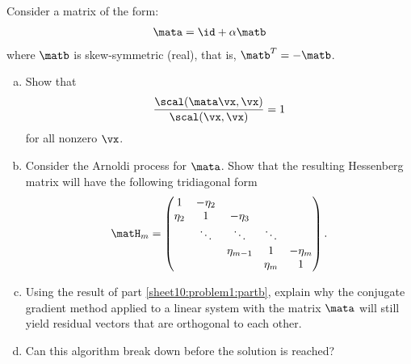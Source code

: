 
\begin{Sheet}
  \label{sheet10}

  \begin{Problem}%
    Consider a matrix of the form:
    \begin{gather*}
      \mata = \id + \alpha \matb
    \end{gather*}
    where $\matb$ is skew-symmetric (real), that is,
    $\matb^T = -\matb$.
    \begin{enumerate}[(a)]
    \item Show that
      \begin{gather*}
        \frac{\scal(\mata\vx,\vx)}{\scal(\vx,\vx)} = 1
      \end{gather*}
      for all nonzero $\vx$.
    \item\label{sheet10:problem1:partb} Consider the Arnoldi process
      for $\mata$. Show that the resulting Hessenberg matrix will have
      the following tridiagonal form
      \begin{gather*}
        \matH_m =
        \begin{pmatrix}
          1&-\eta_2&&& \\
          \eta_2&1&-\eta_3&& \\
           &\ddots&\ddots&\ddots& \\
           &&\eta_{m-1}&1&-\eta_m \\
           &&&\eta_m&1
        \end{pmatrix}
        .
      \end{gather*}
    \item Using the result of part \eqref{sheet10:problem1:partb},
      explain why the conjugate gradient method applied to a linear
      system with the matrix $\mata$ will still yield residual vectors
      that are orthogonal to each other.
    \item Can this algorithm break down before the solution is
      reached?
    \end{enumerate}
  \end{Problem}


\end{Sheet}
